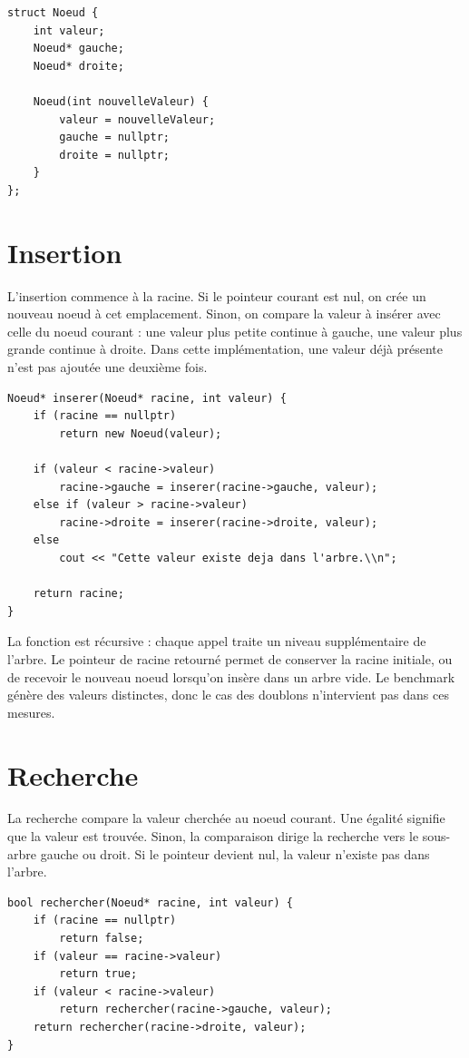 \documentclass[10pt,a4paper]{article}
\begin{document}
\begin{lstlisting}
struct Noeud {
    int valeur;
    Noeud* gauche;
    Noeud* droite;

    Noeud(int nouvelleValeur) {
        valeur = nouvelleValeur;
        gauche = nullptr;
        droite = nullptr;
    }
};
\end{lstlisting}

\section{Insertion}
L'insertion commence à la racine. Si le pointeur courant est nul, on crée
un nouveau noeud à cet emplacement. Sinon, on compare la valeur à insérer
avec celle du noeud courant : une valeur plus petite continue à gauche,
une valeur plus grande continue à droite. Dans cette implémentation, une
valeur déjà présente n'est pas ajoutée une deuxième fois.

\begin{lstlisting}
Noeud* inserer(Noeud* racine, int valeur) {
    if (racine == nullptr)
        return new Noeud(valeur);

    if (valeur < racine->valeur)
        racine->gauche = inserer(racine->gauche, valeur);
    else if (valeur > racine->valeur)
        racine->droite = inserer(racine->droite, valeur);
    else
        cout << "Cette valeur existe deja dans l'arbre.\\n";

    return racine;
}
\end{lstlisting}

La fonction est récursive : chaque appel traite un niveau supplémentaire
de l'arbre. Le pointeur de racine retourné permet de conserver la racine
initiale, ou de recevoir le nouveau noeud lorsqu'on insère dans un arbre
vide. Le benchmark génère des valeurs distinctes, donc le cas des doublons
n'intervient pas dans ces mesures.

\section{Recherche}
La recherche compare la valeur cherchée au noeud courant. Une égalité
signifie que la valeur est trouvée. Sinon, la comparaison dirige la
recherche vers le sous-arbre gauche ou droit. Si le pointeur devient nul,
la valeur n'existe pas dans l'arbre.

\begin{lstlisting}
bool rechercher(Noeud* racine, int valeur) {
    if (racine == nullptr)
        return false;
    if (valeur == racine->valeur)
        return true;
    if (valeur < racine->valeur)
        return rechercher(racine->gauche, valeur);
    return rechercher(racine->droite, valeur);
}
\end{lstlisting}
\end{document}
